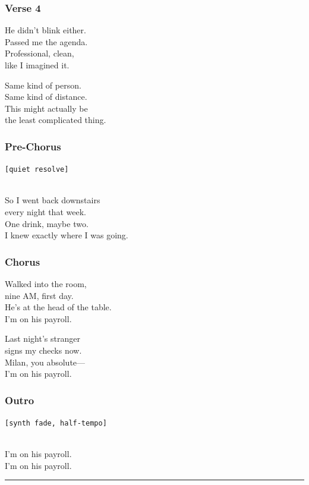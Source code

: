 \subsubsection{Verse 4}\label{verse-4-11}

He didn't blink either.\\
Passed me the agenda.\\
Professional, clean,\\
like I imagined it.

Same kind of person.\\
Same kind of distance.\\
This might actually be\\
the least complicated thing.

\subsubsection{Pre-Chorus}\label{pre-chorus-40}

\texttt{{[}quiet\ resolve{]}}\strut \\
So I went back downstairs\\
every night that week.\\
One drink, maybe two.\\
I knew exactly where I was going.

\subsubsection{Chorus}\label{chorus-54}

Walked into the room,\\
nine AM, first day.\\
He's at the head of the table.\\
I'm on his payroll.

Last night's stranger\\
signs my checks now.\\
Milan, you absolute---\\
I'm on his payroll.

\subsubsection{Outro}\label{outro-6}

\texttt{{[}synth\ fade,\ half-tempo{]}}\strut \\
I'm on his payroll.\\
I'm on his payroll.

\begin{center}\rule{0.5\linewidth}{0.5pt}\end{center}

